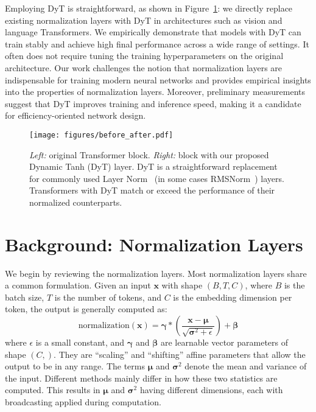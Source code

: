 \documentclass[]{fairmeta}
\def\vx{{\bm{x}}}
\begin{document}
Employing DyT is straightforward, as shown in Figure~\ref{figure:before_after}: we directly replace existing normalization layers with DyT in architectures such as vision and language Transformers. We empirically demonstrate that models with DyT can train stably and achieve high final performance across a wide range of settings.
It often does not require tuning the training hyperparameters on the original architecture. 
Our work challenges the notion that normalization layers are indispensable for training modern neural networks and provides empirical insights into the properties of normalization layers.
Moreover, preliminary measurements suggest that DyT improves training and inference speed, making it a candidate for efficiency-oriented network design.

\begin{figure}[t]
\centering
\vspace{0.4in}
\texttt{[image: figures/before\_after.pdf]}
\caption{\emph{Left:} original Transformer block. \emph{Right:} block with our proposed Dynamic Tanh (DyT) layer. DyT is a straightforward replacement for commonly used Layer Norm~\citep{ba2016layer} (in some cases RMSNorm~\citep{zhang2019root}) layers. Transformers with DyT match or exceed the performance of their normalized counterparts.}
\label{figure:before_after}
\end{figure}



\section{Background: Normalization Layers}


We begin by reviewing the normalization layers. 
Most normalization layers share a common formulation.
Given an input $\vx$ with shape $(B, T, C)$, where $B$ is the batch size, $T$ is the number of tokens, and $C$ is the embedding dimension per token, the output is generally computed as: 
\begin{equation}
\mathrm{normalization}(\vx) = \bm \gamma * \left ( \frac{\vx - \bm \mu}{\sqrt{\bm \sigma^2 + \epsilon }}  \right ) + \bm \beta
\end{equation}
where $\epsilon$ is a small constant, and $\bm \gamma$ and $\bm \beta$ are learnable vector parameters of shape $(C,)$. They are ``scaling'' and ``shifting'' affine parameters that allow the output to be in any range.
The terms $\bm \mu$ and $\bm \sigma^2$ denote the mean and variance of the input. Different methods mainly differ in how these two statistics are computed. This results in $\bm \mu$ and $\bm \sigma^2$ having different dimensions, each with broadcasting applied during computation.
\end{document}
